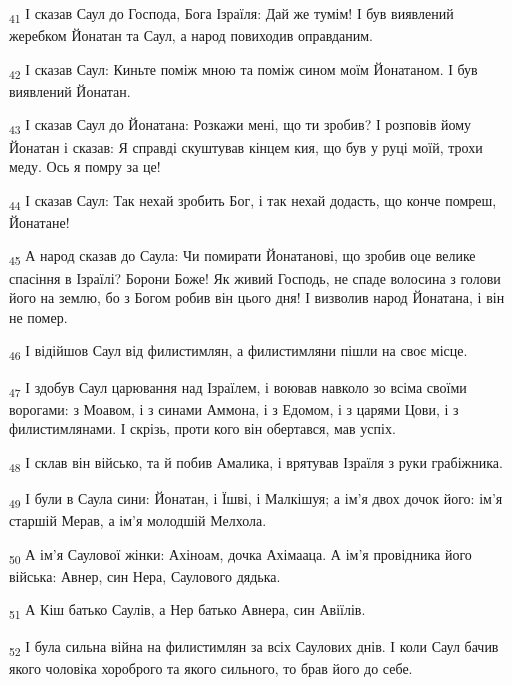 \begin{tcolorbox}
\textsubscript{41} І сказав Саул до Господа, Бога Ізраїля: Дай же тумім! І був виявлений жеребком Йонатан та Саул, а народ повиходив оправданим.
\end{tcolorbox}
\begin{tcolorbox}
\textsubscript{42} І сказав Саул: Киньте поміж мною та поміж сином моїм Йонатаном. І був виявлений Йонатан.
\end{tcolorbox}
\begin{tcolorbox}
\textsubscript{43} І сказав Саул до Йонатана: Розкажи мені, що ти зробив? І розповів йому Йонатан і сказав: Я справді скуштував кінцем кия, що був у руці моїй, трохи меду. Ось я помру за це!
\end{tcolorbox}
\begin{tcolorbox}
\textsubscript{44} І сказав Саул: Так нехай зробить Бог, і так нехай додасть, що конче помреш, Йонатане!
\end{tcolorbox}
\begin{tcolorbox}
\textsubscript{45} А народ сказав до Саула: Чи помирати Йонатанові, що зробив оце велике спасіння в Ізраїлі? Борони Боже! Як живий Господь, не спаде волосина з голови його на землю, бо з Богом робив він цього дня! І визволив народ Йонатана, і він не помер.
\end{tcolorbox}
\begin{tcolorbox}
\textsubscript{46} І відійшов Саул від филистимлян, а филистимляни пішли на своє місце.
\end{tcolorbox}
\begin{tcolorbox}
\textsubscript{47} І здобув Саул царювання над Ізраїлем, і воював навколо зо всіма своїми ворогами: з Моавом, і з синами Аммона, і з Едомом, і з царями Цови, і з филистимлянами. І скрізь, проти кого він обертався, мав успіх.
\end{tcolorbox}
\begin{tcolorbox}
\textsubscript{48} І склав він військо, та й побив Амалика, і врятував Ізраїля з руки грабіжника.
\end{tcolorbox}
\begin{tcolorbox}
\textsubscript{49} І були в Саула сини: Йонатан, і Їшві, і Малкішуя; а ім'я двох дочок його: ім'я старшій Мерав, а ім'я молодшій Мелхола.
\end{tcolorbox}
\begin{tcolorbox}
\textsubscript{50} А ім'я Саулової жінки: Ахіноам, дочка Ахімааца. А ім'я провідника його війська: Авнер, син Нера, Саулового дядька.
\end{tcolorbox}
\begin{tcolorbox}
\textsubscript{51} А Кіш батько Саулів, а Нер батько Авнера, син Авіїлів.
\end{tcolorbox}
\begin{tcolorbox}
\textsubscript{52} І була сильна війна на филистимлян за всіх Саулових днів. І коли Саул бачив якого чоловіка хороброго та якого сильного, то брав його до себе.
\end{tcolorbox}
